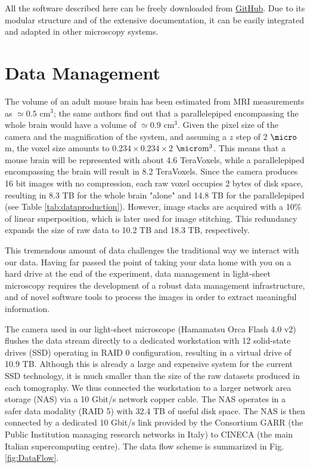 \documentclass[12pt]{spieman}  %
\begin{document}
All the software described here can be freely downloaded from \href{https://github.com/marcelvanthoff/Giorgio}{GitHub}. Due to its modular structure and of the extensive documentation, it can be easily integrated and adapted in other microscopy systems.

\section{Data Management}

The volume of an adult mouse brain has been estimated from MRI measurements \cite{Kovacevic2005} as $\simeq 0.5$ $\text{cm}^3$; the same authors find out that a parallelepiped encompassing the whole brain would have a volume of $\simeq 0.9$ $\text{cm}^3$. Given the pixel size of the camera and the magnification of the system, and assuming a $z$ step of 2 $\micro$m, the voxel size amounts to $0.234\times0.234\times2$ $\micro\text{m}^3$. This means that a mouse brain will be represented with about 4.6 TeraVoxels, while a parallelepiped encompassing the brain will result in 8.2 TeraVoxels. Since the camera produces 16 bit images with no compression, each raw voxel occupies 2 bytes of disk space, resulting in 8.3 TB for the whole brain "alone" and 14.8 TB for the parallelepiped (see Table \ref{tab:dataproduction}). However, image stacks are acquired with a 10\% of linear superposition, which is later used for image stitching. This redundancy expands the size of raw data to 10.2 TB and 18.3 TB, respectively.

This tremendous amount of data challenges the traditional way we interact with our data. Having far passed the point of taking your data home with you on a hard drive at the end of the experiment, data management in light-sheet microscopy requires the development of a robust data management infrastructure, and of novel software tools to process the images in order to extract meaningful information.

The camera used in our light-sheet microscope (Hamamatsu Orca Flash 4.0 v2) flushes the data stream directly to a dedicated workstation with 12 solid-state drives (SSD) operating in RAID 0 configuration, resulting in a virtual drive of 10.9 TB. Although this is already a large and expensive system for the current SSD technology, it is much smaller than the size of the raw datasets produced in each tomography. We thus connected the workstation to a larger network area storage (NAS) via a 10 Gbit/s network copper cable. The NAS operates in a safer data modality (RAID 5) with 32.4 TB of useful disk space. The NAS is then connected by a dedicated 10 Gbit/s link provided by the Consortium GARR (the Public Institution managing research networks in Italy) to CINECA (the main Italian supercomputing centre). The data flow scheme is summarized in Fig. \ref{fig:DataFlow}.
\end{document}
